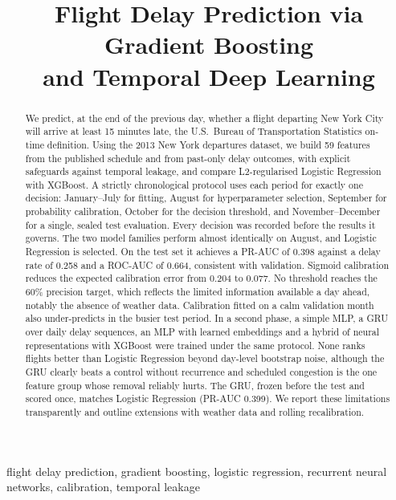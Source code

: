 \documentclass[conference]{IEEEtran}
\begin{document}
\title{Flight Delay Prediction via Gradient Boosting\\ and Temporal Deep Learning}

\author{}

\maketitle

\begin{abstract}
We predict, at the end of the previous day, whether a flight departing New York City will arrive at
least 15 minutes late, the U.S.\ Bureau of Transportation Statistics on-time definition. Using
the 2013 New York departures dataset, we build 59 features from the published schedule and from
past-only delay outcomes, with explicit safeguards against temporal leakage, and compare
L2-regularised Logistic Regression with XGBoost. A strictly chronological protocol uses each
period for exactly one decision: January--July for fitting, August for hyperparameter selection,
September for probability calibration, October for the decision threshold, and
November--December for a single, sealed test evaluation. Every decision was recorded before the
results it governs. The two model families perform almost identically on August, and Logistic
Regression is selected. On the test set it achieves a PR-AUC of 0.398 against a delay rate of
0.258 and a ROC-AUC of 0.664, consistent with validation. Sigmoid calibration reduces the expected
calibration error from 0.204 to 0.077. No threshold reaches the 60\% precision target, which
reflects the limited information available a day ahead, notably the absence of weather data.
Calibration fitted on a calm validation month also under-predicts in the busier test period. In a
second phase, a simple MLP, a GRU over daily delay sequences, an MLP with learned embeddings and a
hybrid of neural representations with XGBoost were trained under the same protocol. None ranks
flights better than Logistic Regression beyond day-level bootstrap noise, although the GRU clearly
beats a control without recurrence and scheduled congestion is the one feature group whose removal
reliably hurts. The GRU, frozen before the test and scored once, matches Logistic Regression
(PR-AUC 0.399). We report these limitations transparently and outline extensions with weather data
and rolling recalibration.
\end{abstract}

\begin{IEEEkeywords}
flight delay prediction, gradient boosting, logistic regression, recurrent neural networks, calibration, temporal leakage
\end{IEEEkeywords}













\end{document}

